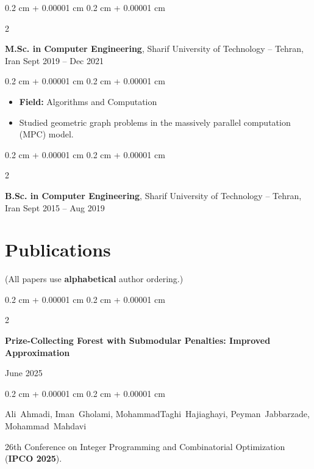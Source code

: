\documentclass[10pt, letterpaper]{article}
\newenvironment{highlights}{
    \begin{itemize}[
        topsep=0.1 cm,
        parsep=0.10 cm,
        partopsep=0pt,
        itemsep=0pt,
        leftmargin=0.4 cm + 10pt
    ]
}{
    \end{itemize}
} %
\newenvironment{onecolentry}{
    \begin{adjustwidth}{
        0.2 cm + 0.00001 cm
    }{
        0.2 cm + 0.00001 cm
    }
}{
    \end{adjustwidth}
} %
\newenvironment{twocolentry}[2][]{
    \onecolentry
    \def\secondColumn{#2}
    \setcolumnwidth{\fill, 4.5 cm}
    \begin{paracol}{2}
}{
    \switchcolumn \raggedleft \secondColumn
    \end{paracol}
    \endonecolentry
} %
\begin{document}
        \vspace{0.2 cm}

        \begin{twocolentry}{
            Sept 2019 – Dec 2021
        }
            \textbf{M.Sc. in Computer Engineering}, Sharif University of Technology -- Tehran, Iran\end{twocolentry}

        \vspace{0.1 cm}
        \begin{onecolentry}
            \begin{highlights}
                \item \textbf{Field:} Algorithms and Computation
                \item Studied geometric graph problems in the massively parallel computation (MPC) model.
            \end{highlights}
        \end{onecolentry}


        \vspace{0.2 cm}

        \begin{twocolentry}{
            Sept 2015 – Aug 2019
        }
            \textbf{B.Sc. in Computer Engineering}, Sharif University of Technology -- Tehran, Iran\end{twocolentry}




    
    \section{Publications}



        (All papers use {\bf alphabetical} author ordering.)


        \vspace{0.2 cm}


        \begin{samepage}
            \begin{twocolentry}{
                June 2025
            }
                \textbf{Prize-Collecting Forest with Submodular Penalties: Improved Approximation}
            \end{twocolentry}

            \vspace{0.1 cm}
            
            \begin{onecolentry}
                \mbox{Ali Ahmadi}, \mbox{Iman Gholami}, \mbox{MohammadTaghi Hajiaghayi}, \mbox{Peyman Jabbarzade}, \mbox{Mohammad Mahdavi}

                \vspace{0.10 cm}
                
        26th Conference on Integer Programming and Combinatorial Optimization (\textbf{IPCO 2025}).\end{onecolentry}
        \end{samepage}
\end{document}
